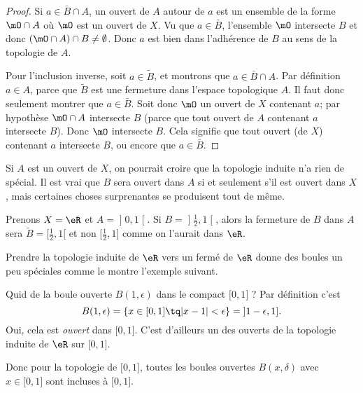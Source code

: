 \begin{proof}
    Si \( a\in \bar B\cap A\), un ouvert de \( A\) autour de \( a\) est un ensemble de la forme \( \mO\cap A\) où \( \mO\) est un ouvert de \( X\). Vu que \( a\in\bar B\), l'ensemble \( \mO\) intersecte \( B\) et donc \( (\mO\cap A)\cap B\neq \emptyset\). Donc \( a\) est bien dans l'adhérence de \( B\) au sens de la topologie de \( A\).

    Pour l'inclusion inverse, soit \( a\in \tilde  B\), et montrons que \( a\in \bar B\cap A\). Par définition \( a\in A\), parce que \( \tilde B\) est une fermeture dans l'espace topologique \( A\). Il faut donc seulement montrer que \( a\in\bar B\). Soit donc \( \mO\) un ouvert de \( X\) contenant \( a\); par hypothèse \( \mO\cap A\) intersecte \( B\) (parce que tout ouvert de \( A\) contenant \( a\) intersecte \( B\)). Donc \( \mO\) intersecte \( B\). Cela signifie que tout ouvert (de \( X\)) contenant \( a\) intersecte \( B\), ou encore que \( a\in \bar B\).
\end{proof}

Si \( A\) est un ouvert de \( X\), on pourrait croire que la topologie induite n'a rien de spécial. Il est vrai que \( B\) sera ouvert dans \( A\) si et seulement s'il est ouvert dans \( X\), mais certaines choses surprenantes se produisent tout de même.

\begin{example} \label{ExloeyoR}
Prenons \( X=\eR\) et \( A=\mathopen] 0 , 1 \mathclose[\). Si \( B=\mathopen] \frac{ 1 }{2} , 1 \mathclose[ \), alors la fermeture de \( B\) dans \( A\) sera \( \tilde B=\mathopen[ \frac{ 1 }{2} , 1 [\) et non \( \mathopen[ \frac{ 1 }{2} , 1 \mathclose]\) comme on l'aurait dans \( \eR\).
\end{example}

Prendre la topologie induite de \( \eR\) vers un fermé de \( \eR\) donne des boules un peu spéciales comme le montre l'exemple suivant.

\begin{example}  \label{ExKYZwYxn}
    Quid de la boule ouverte \( B(1,\epsilon)\) dans le compact \( \mathopen[ 0 , 1 \mathclose]\) ? Par définition c'est
    \begin{equation}
        B(1,\epsilon)=\{ x\in\mathopen[ 0 , 1 \mathclose]\tq | x-1 |<\epsilon \}=\mathopen] 1-\epsilon , 1 \mathclose].
    \end{equation}
    Oui, cela est \emph{ouvert} dans \( \mathopen[ 0 , 1 \mathclose]\). C'est d'ailleurs un des ouverts de la topologie induite de \( \eR\) sur \( \mathopen[ 0 , 1 \mathclose]\).

    Donc pour la topologie de \( \mathopen[ 0 , 1 \mathclose]\), toutes les boules ouvertes \( B(x,\delta)\) avec \( x\in\mathopen[ 0 , 1 \mathclose]\) sont incluses à \( \mathopen[ 0 , 1 \mathclose]\).
\end{example}

